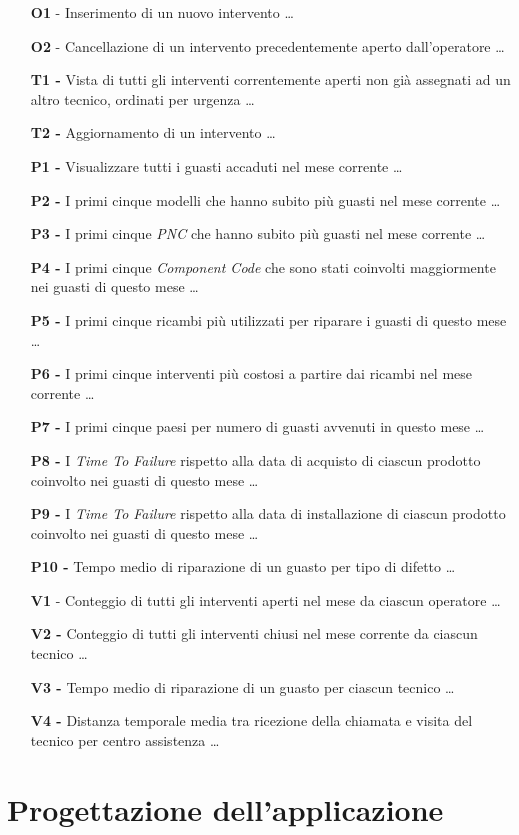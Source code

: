 \documentclass[a4paper, 12pt]{report}
\begin{document}
\begin{itemize}
	\item[\textbf{O1} -] Inserimento di un nuovo intervento
	\subitem \dots
	\item[\textbf{O2} -] Cancellazione di un intervento precedentemente aperto dall'operatore
	\subitem \dots
	\item[\textbf{T1 -}] Vista di tutti gli interventi correntemente aperti non già assegnati ad un altro tecnico, ordinati per urgenza
	\subitem \dots
	\item[\textbf{T2 -}] Aggiornamento di un intervento
	\subitem \dots
	\item[\textbf{P1 -}] Visualizzare tutti i guasti accaduti nel mese corrente
	\subitem \dots
	\item[\textbf{P2 -}] I primi cinque modelli che hanno subito più guasti nel mese corrente
	\subitem \dots
	\item[\textbf{P3 -}] I primi cinque \textit{PNC} che hanno subito più guasti nel mese corrente
	\subitem \dots
	\item[\textbf{P4 -}] I primi cinque \textit{Component Code} che sono stati coinvolti maggiormente nei guasti di questo mese
	\subitem \dots
	\item[\textbf{P5 -}] I primi cinque ricambi più utilizzati per riparare i guasti di questo mese
	\subitem \dots
	\item[\textbf{P6 -}] I primi cinque interventi più costosi a partire dai ricambi nel mese corrente
	\subitem \dots
	\item[\textbf{P7 -}] I primi cinque paesi per numero di guasti avvenuti in questo mese
	\subitem \dots
	\item[\textbf{P8 -}] I \textit{Time To Failure} rispetto alla data di acquisto di ciascun prodotto coinvolto nei guasti di questo mese
	\subitem \dots
	\item[\textbf{P9 -}] I \textit{Time To Failure} rispetto alla data di installazione di ciascun prodotto coinvolto nei guasti di questo mese
	\subitem \dots
	\item[\textbf{P10 -}] Tempo medio di riparazione di un guasto per tipo di difetto
	\subitem \dots
	\item[\textbf{V1} -] Conteggio di tutti gli interventi aperti nel mese da ciascun operatore
	\subitem \dots
	\item[\textbf{V2 -}] Conteggio di tutti gli interventi chiusi nel mese corrente da ciascun tecnico
	\subitem \dots
	\item[\textbf{V3 -}] Tempo medio di riparazione di un guasto per ciascun tecnico
	\subitem \dots
	\item[\textbf{V4 -}] Distanza temporale media tra ricezione della chiamata e visita del tecnico per centro assistenza
	\subitem \dots
\end{itemize}

\chapter{Progettazione dell'applicazione}
\end{document}
